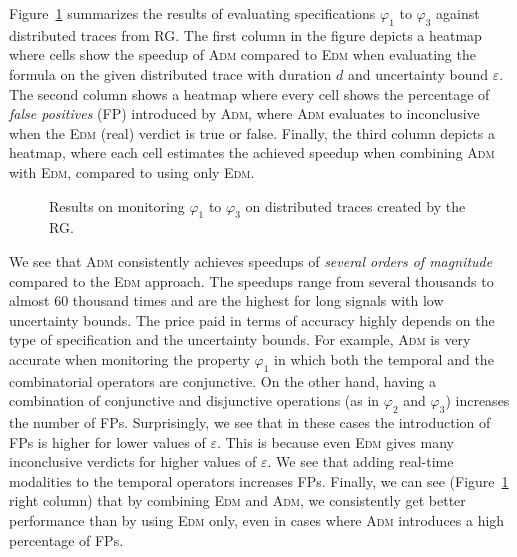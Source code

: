 Figure~\ref{fig:rgresults} summarizes the results of evaluating specifications $\varphi_1$ to $\varphi_3$ against distributed traces from RG. The first column in the figure depicts a heatmap where cells show the speedup of \textsc{Adm} compared to \textsc{Edm} when evaluating the formula on the given distributed trace with duration $d$ and uncertainty bound $\varepsilon$. The second column shows a heatmap where every cell shows the percentage of \emph{false positives} (FP) introduced by \textsc{Adm}, where \textsc{Adm} evaluates to inconclusive when the \textsc{Edm} (real) verdict is true or false. Finally, the third column depicts a heatmap, where each cell estimates the achieved speedup when combining \textsc{Adm} with \textsc{Edm}, compared to using only \textsc{Edm}.

\begin{figure}[t]
	\begin{center}
\caption{Results on monitoring $\varphi_{1}$ to $\varphi_{3}$ on distributed traces created by the RG.}
\label{fig:rgresults}
\end{center}
\end{figure}


We see that \textsc{Adm} consistently achieves speedups of \emph{several orders of magnitude} 
compared to the \textsc{Edm} approach.
The speedups range from several thousands to almost 60 thousand times
and are the highest for long signals with low uncertainty bounds.
The price paid in terms of accuracy highly depends on the type of specification and the uncertainty bounds.
For example, \textsc{Adm} is very accurate when monitoring the property $\varphi_1$ in which both the temporal and the combinatorial operators are conjunctive.
On the other hand, having a combination of conjunctive and disjunctive operations (as in $\varphi_{2}$ and $\varphi_{3}$) increases the number of FPs.
Surprisingly, we see that in these cases the introduction of FPs is higher for lower values of $\varepsilon$.
This is because even \textsc{Edm} gives many inconclusive verdicts for higher values of $\varepsilon$.
We see that adding real-time modalities to the temporal operators increases FPs.
Finally, we can see (Figure~\ref{fig:rgresults} right column) that by combining \textsc{Edm} and \textsc{Adm}, we consistently get better performance than by using \textsc{Edm} only, even in cases where \textsc{Adm} introduces a high percentage of FPs.

